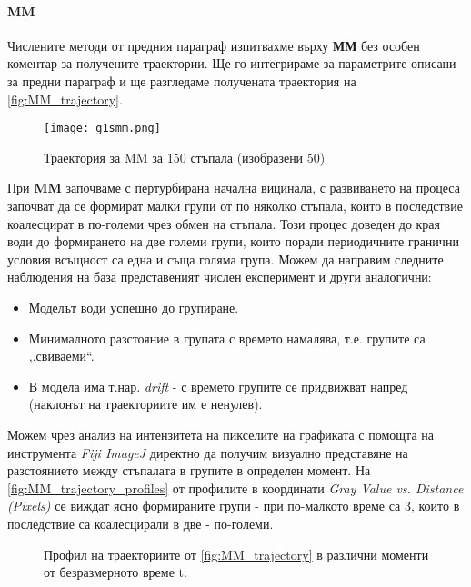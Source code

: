 \paragraph{MM} Числените методи от предния параграф изпитвахме върху \textbf{ММ} без особен коментар за получените траектории. Ще го интегрираме за параметрите описани за предни параграф и ще разгледаме получената траектория на \autoref{fig:MM_trajectory}.
\begin{figure}[htbp]
	\centering
	\texttt{[image: g1smm.png]}
	\caption{Траектория за MM за 150 стъпала (изобразени 50)}
	\label{fig:MM_trajectory}
\end{figure}
При \textbf{MM} започваме с пертурбирана начална вицинала, с развиването на процеса започват да се формират малки групи от по няколко стъпала, които в последствие коалесцират в по-големи чрез обмен на стъпала. Този процес доведен до края води до формирането на две големи групи, които поради периодичните гранични условия всъщност са една и съща голяма група. Можем да направим следните наблюдения на база представеният числен експеримент и други аналогични: 
\begin{itemize}
    \item Моделът води успешно до групиране.
    \item Минималното разстояние в групата с времето намалява, т.е. групите са ,,свиваеми``.
    \item В модела има т.нар. \textit{drift} - с времето групите се придвижват напред (наклонът на траекториите им е ненулев).
\end{itemize}
Можем чрез анализ на интензитета на пикселите на графиката с помощта на инструмента \textit{Fiji ImageJ} директно да получим визуално представяне на разстоянието между стъпалата в групите в определен момент. На \autoref{fig:MM_trajectory_profiles} от профилите в координати \textit{Gray Value vs. Distance (Pixels)} се виждат ясно формираните групи - при по-малкото време са 3, които в последствие са коалесцирали в две - по-големи.
\begin{figure}[hbpt]
    \centering
    \caption{Профил на траекториите от \autoref{fig:MM_trajectory} в различни моменти от безразмерното време t.}
    \label{fig:MM_trajectory_profiles}
\end{figure}

